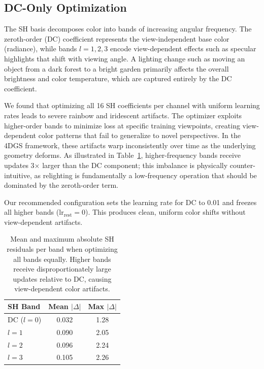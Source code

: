 \documentclass[10pt,twocolumn,letterpaper]{article}
\begin{document}
\subsection{DC-Only Optimization}
\label{sec:dconly}

The SH basis decomposes color into bands of increasing angular frequency. The zeroth-order (DC) coefficient represents the view-independent base color (radiance), while bands $l=1,2,3$ encode view-dependent effects such as specular highlights that shift with viewing angle. A lighting change such as moving an object from a dark forest to a bright garden primarily affects the overall brightness and color temperature, which are captured entirely by the DC coefficient.

We found that optimizing all 16 SH coefficients per channel with uniform learning rates leads to severe rainbow and iridescent artifacts. The optimizer exploits higher-order bands to minimize loss at specific training viewpoints, creating view-dependent color patterns that fail to generalize to novel perspectives. In the 4DGS framework, these artifacts warp inconsistently over time as the underlying geometry deforms. As illustrated in Table~\ref{tab:sh_deltas}, higher-frequency bands receive updates 3$\times$ larger than the DC component; this imbalance is physically counter-intuitive, as relighting is fundamentally a low-frequency operation that should be dominated by the zeroth-order term.

Our recommended configuration sets the learning rate for DC to 0.01 and freezes all higher bands ($\text{lr}_{\text{rest}} = 0$). This produces clean, uniform color shifts without view-dependent artifacts.

\begin{table}[t]
\centering
\small
\begin{tabular}{lcc}
\toprule
SH Band & Mean $|\Delta|$ & Max $|\Delta|$ \\
\midrule
DC ($l=0$) & 0.032 & 1.28 \\
$l=1$ & 0.090 & 2.05 \\
$l=2$ & 0.096 & 2.24 \\
$l=3$ & 0.105 & 2.26 \\
\bottomrule
\end{tabular}
\caption{Mean and maximum absolute SH residuals per band when optimizing all bands equally. Higher bands receive disproportionately large updates relative to DC, causing view-dependent color artifacts.}
\label{tab:sh_deltas}
\end{table}
\end{document}
